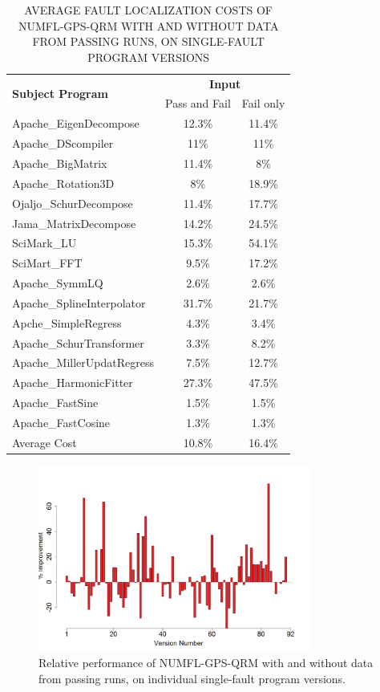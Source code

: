 \begin{table}[htbp!]
\caption{AVERAGE FAULT LOCALIZATION COSTS OF NUMFL-GPS-QRM WITH AND WITHOUT DATA FROM PASSING RUNS, ON SINGLE-FAULT PROGRAM VERSIONS}
\label{table3}
\centering
      \begin{tabular}{|l|c|c|}
      \hline
\multirow{2}{*}{{\bf Subject Program}}	&	\multicolumn{2}{|c|}{{\bf Input}}	\\	\cline{2-3}
& Pass and Fail	&Fail only \\ \hline
Apache\_EigenDecompose	&	12.3\%	&	11.4\%	\\	\hline
Apache\_DScompiler	&	11\%	&	11\%	\\	\hline
Apache\_BigMatrix	&	11.4\%	&	8\%	\\	\hline
Apache\_Rotation3D	&	8\%	&	18.9\%	\\	\hline
Ojaljo\_SchurDecompose	&	11.4\%	&	17.7\%	\\	\hline
Jama\_MatrixDecompose	&	14.2\%	&	24.5\%	\\	\hline
SciMark\_LU	&	15.3\%	&	54.1\%	\\	\hline
SciMart\_FFT	&	9.5\%	&	17.2\%	\\	\hline
Apache\_SymmLQ	&	2.6\%	&	2.6\%	\\	\hline
Apache\_SplineInterpolator	&	31.7\%	&	21.7\%	\\	\hline
Apche\_SimpleRegress	&	4.3\%	&	3.4\%	\\	\hline
Apache\_SchurTransformer	&	3.3\%	&	8.2\%	\\	\hline
Apache\_MillerUpdatRegress	&	7.5\%	&	12.7\%	\\	\hline
Apache\_HarmonicFitter	&	27.3\%	&	47.5\%	\\	\hline
Apache\_FastSine	&	1.5\%	&	1.5\%	\\	\hline
Apache\_FastCosine	&	1.3\%	&	1.3\%	\\	\hline
Average Cost	&	10.8\%	&	16.4\%	\\	\hline
\end{tabular}
\end{table}

\begin{figure}[!thpb]
\centering
\includegraphics[width=0.8\textwidth]{chapter3_QRM_allFail.pdf}
\caption{Relative performance of NUMFL-GPS-QRM with and without data from passing runs, on individual single-fault program versions.}
\label{QRM_allFail}
\end{figure}


